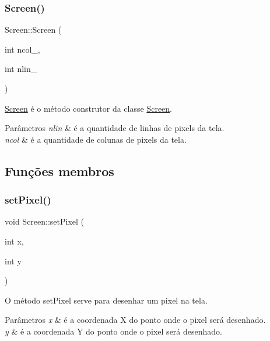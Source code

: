 \subsubsection{\texorpdfstring{Screen()}{Screen()}}
{\footnotesize\ttfamily Screen\+::\+Screen (\begin{DoxyParamCaption}\item[{int}]{ncol\+\_\+,  }\item[{int}]{nlin\+\_\+ }\end{DoxyParamCaption})}



\mbox{\hyperlink{class_screen}{Screen}} é o método construtor da classe \mbox{\hyperlink{class_screen}{Screen}}. 


\begin{DoxyParams}{Parâmetros}
{\em nlin} & é a quantidade de linhas de pixels da tela. \\
\hline
{\em ncol} & é a quantidade de colunas de pixels da tela. \\
\hline
\end{DoxyParams}


\subsection{Funções membros}
\mbox{\label{class_screen_ae6bea81c57a22d226507c3c26fa95ee0}} 
\subsubsection{\texorpdfstring{set\+Pixel()}{setPixel()}}
{\footnotesize\ttfamily void Screen\+::set\+Pixel (\begin{DoxyParamCaption}\item[{int}]{x,  }\item[{int}]{y }\end{DoxyParamCaption})}



O método set\+Pixel serve para desenhar um pixel na tela. 


\begin{DoxyParams}{Parâmetros}
{\em x} & é a coordenada X do ponto onde o pixel será desenhado. \\
\hline
{\em y} & é a coordenada Y do ponto onde o pixel será desenhado. \\
\hline
\end{DoxyParams}


